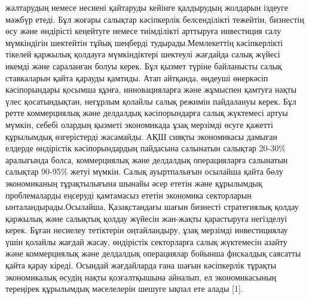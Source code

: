 \begin{multicols}{2}
жалтарудың немесе несиені қайтаруды кейінге қалдырудың жолдарын іздеуге
мәжбүр етеді. Бұл жоғары салықтар кәсіпкерлік белсенділікті тежейтін,
бизнестің өсу және өндірісті кеңейтуге немесе тиімділікті арттыруға
инвестиция салу мүмкіндігін шектейтін тұйық шеңберді
тудырады.Мемлекеттің кәсіпкерлікті тікелей қаржылық қолдауға
мүмкіндіктері шектеулі жағдайда салық жүйесі икемді және сараланған
болуы керек. Бұл қызмет түріне байланысты салық ставкаларын қайта
қарауды қамтиды. Атап айтқанда, өңдеуші өнеркәсіп кәсіпорындары қосымша
құнға, инновацияларға және жұмыспен қамтуға нақты үлес қосатындықтан,
неғұрлым қолайлы салық режимін пайдалануы керек. Бұл ретте коммерциялық
және делдалдық кәсіпорындарға салық жүктемесі артуы мүмкін, себебі
олардың қызметі экономикада ұзақ мерзімді өсуге қажетті құрылымдық
өзгерістерді жасамайды. АҚШ сияқты экономикасы дамыған елдерде
өндірістік кәсіпорындардың пайдасына салынатын салықтар 20-30\%
аралығында болса, коммерциялық және делдалдық операцияларға салынатын
салықтар 90-95\% жетуі мүмкін. Салық ауыртпалығын осылайша қайта бөлу
экономиканың тұрақтылығына шынайы әсер ететін және құрылымдық
проблемаларды еңсеруді қамтамасыз ететін экономика секторларын
ынталандырады.Осылайша, Қазақстандағы шағын бизнесті стратегиялық қолдау
қаржылық және салықтық қолдау жүйесін жан-жақты қарастыруға негізделуі
керек. Бұған несиелеу тетіктерін оңтайландыру, ұзақ мерзімді
инвестициялау үшін қолайлы жағдай жасау, өндірістік секторларға салық
жүктемесін азайту және коммерциялық және делдалдық операциялар бойынша
фискалдық саясатты қайта қарау кіреді. Осындай жағдайларда ғана шағын
кәсіпкерлік тұрақты экономикалық өсудің нақты қозғалтқышына айналып, ел
экономикасының тереңірек құрылымдық мәселелерін шешуге ықпал ете алады
{[}1{]}.


\end{multicols}
